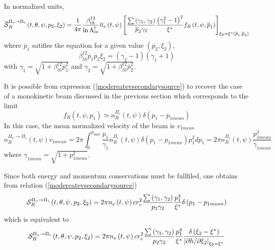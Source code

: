 In normalized units,  
\begin{equation}
\overline{\mathcal{S}}_{R}^{\Pi _{o}\rightarrow \Pi _{i}}\left( t,\theta
,\psi ,p_{2},\xi _{2}\right) =\frac{1}{4\pi }\frac{\beta _{th}^{\dag 2}}{\ln
\Lambda _{ee}^{\dag }}\overline{n}_{e}\left( t,\psi \right) \left[ \frac{%
\sum \left( \gamma _{1},\gamma _{2}\right) }{\overline{p}_{2}\gamma _{2}}%
\frac{\left( \gamma _{1}^{2}-1\right) ^{2}}{\xi ^{\ast }}f_{R}\left( t,\psi ,%
\overline{p}_{1}\right) \right] _{\xi _{2}=\xi ^{\ast }\left( \overline{p}%
_{1},\overline{p}_{2}\right) }
\end{equation}%
where $\overline{p}_{1}$ satifies the equation for a given value $\left( 
\overline{p}_{2},\xi _{2}\right) ,$%
\begin{equation}
\beta _{th}^{\dag 2}\overline{p}_{1}\overline{p}_{2}\xi _{2}=\left( \gamma
_{2}-1\right) \left( \gamma _{1}+1\right) 
\end{equation}%
with $\gamma _{1}=\sqrt{1+\beta _{th}^{\dag 2}\overline{p}_{1}^{2}}$ and $%
\gamma _{2}=\sqrt{1+\beta _{th}^{\dag 2}\overline{p}_{2}^{2}}.$

It is possible from expression (\ref{modereatevsecondarysource}) to recover
the case of a monokinetic beam discussed in the previous section which
corresponds to the limit 
\begin{equation}
f_{R}\left( t,\psi ,p_{1}\right) \simeq n_{R}^{\Pi _{i}}\left( t,\psi
\right) \delta \left( p_{1}-p_{1mean}\right)
\end{equation}%
In this case, the mean normalized velocity of the beam is $v_{1mean}$%
\begin{equation}
n_{R}^{\Pi _{o}\rightarrow \Pi _{i}}\left( t,\psi \right) v_{1mean}=2\pi
\int_{0}^{p_{\max }}\frac{p_{1}}{\gamma _{1}}n_{R}^{\Pi _{i}}\left( t,\psi
\right) \delta \left( p_{1}-p_{1mean}\right) p_{1}^{2}dp_{1}=2\pi n_{R}^{\Pi
_{i}}\left( t,\psi \right) \frac{p_{1mean}^{3}}{\gamma _{1mean}}
\end{equation}%
where $\gamma _{1mean}=\sqrt{1+p_{1mean}^{2}}.$

Since both energy and momentum conservations must be fullfiled, one obtains
from relation (\ref{modereatevsecondarysource}) 
\begin{equation}
\mathcal{S}_{R}^{\Pi _{o}\rightarrow \Pi _{i}}\left( t,\theta ,\psi
,p_{2},\xi _{2}\right) =2\pi n_{e}\left( t,\psi \right) cr_{e}^{2}\frac{\sum
\left( \gamma _{1},\gamma _{2}\right) }{p_{2}\gamma _{2}}\frac{p_{1}^{4}}{%
\xi ^{\ast }}\delta \left( p_{1}-p_{1mean}\right)
\end{equation}%
which is equivalent to 
\begin{equation}
\mathcal{S}_{R}^{\Pi _{o}\rightarrow \Pi _{i}}\left( t,\theta ,\psi
,p_{2},\xi _{2}\right) =2\pi n_{e}\left( t,\psi \right) cr_{e}^{2}\frac{\sum
\left( \gamma _{1},\gamma _{2}\right) }{p_{2}\gamma _{2}}\frac{p_{1}^{4}}{%
\xi ^{\ast }}\frac{\delta \left( \xi _{2}-\xi ^{\ast }\right) }{\left\vert
\partial h/\partial \xi _{2}\right\vert _{\xi _{2}=\xi ^{\ast }}}
\end{equation}

